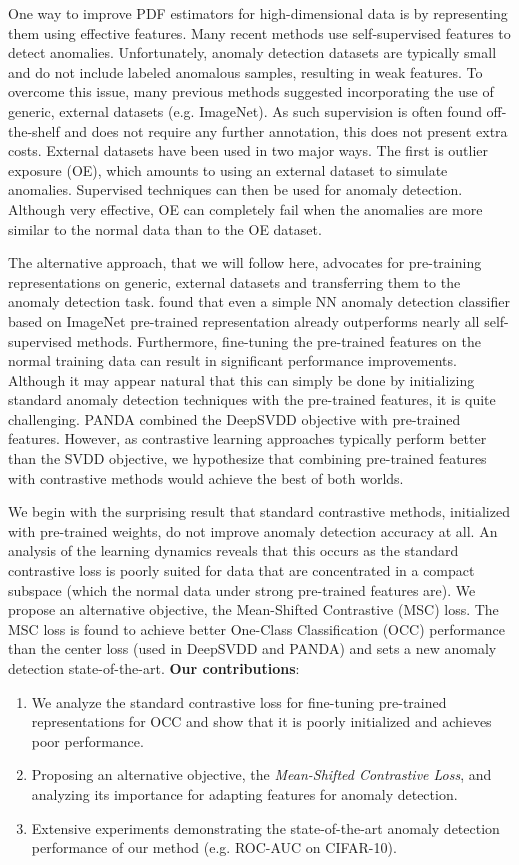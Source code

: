 \documentclass[letterpaper]{article} \usepackage{aaai23}  \usepackage{times}  \usepackage{helvet}  \usepackage{courier}  \usepackage[hyphens]{url}  \usepackage{graphicx} \usepackage{amsmath, amssymb}
\begin{document}
One way to improve PDF estimators for high-dimensional data is by representing them using effective features. Many recent methods use self-supervised features to detect anomalies. Unfortunately, anomaly detection datasets are typically small and do not include labeled anomalous samples, resulting in weak features. To overcome this issue, many previous methods suggested incorporating the use of generic, external datasets (e.g. ImageNet). As such supervision is often found off-the-shelf and does not require any further annotation, this does not present extra costs. External datasets have been used in two major ways. The first is outlier exposure (OE), which amounts to using an external dataset to simulate anomalies. Supervised techniques can then be used for anomaly detection. Although very effective, OE can completely fail when the anomalies are more similar to the normal data than to the OE dataset. 

The alternative approach, that we will follow here, advocates for pre-training representations on generic, external datasets and transferring them to the anomaly detection task. \cite{reiss2021panda} found that even a simple NN anomaly detection classifier based on ImageNet pre-trained representation already outperforms nearly all self-supervised methods. Furthermore, fine-tuning the pre-trained features on the normal training data can result in significant performance improvements. Although it may appear natural that this can simply be done by initializing standard anomaly detection techniques with the pre-trained features, it is quite challenging. PANDA \cite{reiss2021panda} combined the DeepSVDD objective \cite{ruff2018deep} with pre-trained features. However, as contrastive learning approaches typically perform better than the SVDD objective, we hypothesize that combining pre-trained features with contrastive methods would achieve the best of both worlds.

We begin with the surprising result that standard contrastive methods, initialized with pre-trained weights, do not improve anomaly detection accuracy at all. An analysis of the learning dynamics reveals that this occurs as the standard contrastive loss is poorly suited for data that are concentrated in a compact subspace (which the normal data under strong pre-trained features are). We propose an alternative objective, the Mean-Shifted Contrastive (MSC) loss. The MSC loss is found to achieve better One-Class Classification (OCC) performance than the center loss (used in DeepSVDD and PANDA) and sets a new anomaly detection state-of-the-art. \textbf{Our contributions}:
\begin{enumerate}
\item We analyze the standard contrastive loss for fine-tuning pre-trained representations for OCC and show that it is poorly initialized and achieves poor performance.
\item Proposing an alternative objective, the \textit{Mean-Shifted Contrastive Loss}, and analyzing its importance for adapting features for anomaly detection. 
\item Extensive experiments demonstrating the state-of-the-art anomaly detection performance of our method (e.g.  ROC-AUC on CIFAR-10).
\end{enumerate}
\end{document}
